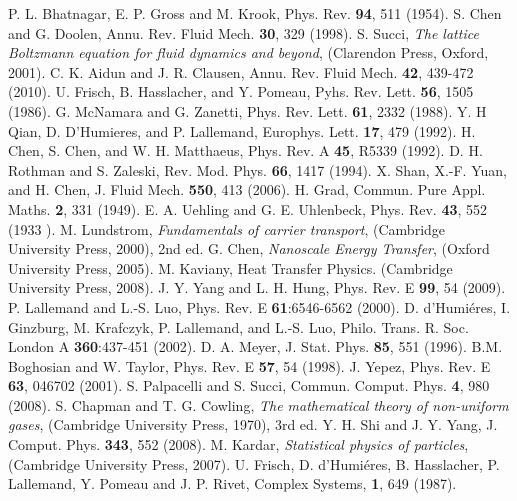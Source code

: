 \documentclass[doublecol]{epl2}
\begin{document}
\begin{thebibliography}{0}

 P. L. Bhatnagar, E. P. Gross and M. Krook, Phys. Rev. {\bf 94}, 511 (1954).
 S. Chen and G. Doolen, Annu. Rev. Fluid Mech. {\bf 30}, 329 (1998).
 S. Succi, {\sl The lattice Boltzmann equation for fluid dynamics and beyond}, (Clarendon Press, Oxford, 2001).
 C. K. Aidun and J. R. Clausen, Annu. Rev. Fluid Mech. {\bf 42}, 439-472 (2010).
 U. Frisch, B. Hasslacher, and Y. Pomeau, Pyhs. Rev. Lett. {\bf 56}, 1505 (1986).
 G. McNamara and G. Zanetti, Phys. Rev. Lett. {\bf 61}, 2332 (1988).
 Y. H Qian, D. D'Humieres, and P. Lallemand, Europhys. Lett. {\bf 17}, 479 (1992).
 H. Chen, S. Chen, and W. H. Matthaeus, Phys. Rev. A {\bf 45}, R5339 (1992).
 D. H. Rothman and S. Zaleski, Rev. Mod. Phys. {\bf 66}, 1417 (1994).
 X. Shan, X.-F. Yuan, and H. Chen, J. Fluid Mech. {\bf 550}, 413 (2006).
 H. Grad, Commun. Pure Appl. Maths. {\bf 2}, 331 (1949).
 E. A. Uehling and G. E. Uhlenbeck, Phys. Rev. {\bf 43}, 552 (1933 ).
 M. Lundstrom, {\sl Fundamentals of carrier transport}, (Cambridge University Press, 2000), 2nd ed.
 G. Chen, {\sl Nanoscale Energy Transfer}, (Oxford University Press, 2005).
 M. Kaviany, Heat Transfer Physics. (Cambridge University Press, 2008).
 J. Y. Yang and L. H. Hung, Phys. Rev. E {\bf 99}, 54 (2009).
 P. Lallemand and  L.-S. Luo, Phys. Rev. E {\bf 61}:6546-6562 (2000).
 D. d'Humi\'{e}res, I. Ginzburg, M. Krafczyk, P. Lallemand, and L.-S. Luo, Philo. Trans. R. Soc. London A {\bf 360}:437-451 (2002).
 D. A. Meyer, J. Stat. Phys. {\bf 85}, 551 (1996).
 B.M. Boghosian and W. Taylor, Phys. Rev. E {\bf 57}, 54 (1998).
 J. Yepez, Phys. Rev. E {\bf 63}, 046702 (2001).
 S. Palpacelli and S. Succi, Commun. Comput. Phys. {\bf 4}, 980 (2008).
 S. Chapman and  T. G. Cowling, {\sl The mathematical theory of non-uniform gases}, (Cambridge University Press, 1970), 3rd ed.
 Y. H. Shi and J. Y. Yang, J. Comput. Phys. {\bf 343}, 552 (2008).
 M. Kardar, {\sl Statistical physics of particles}, (Cambridge University Press, 2007).
 U. Frisch, D. d'Humi\'{e}res, B. Hasslacher, P. Lallemand, Y. Pomeau and J. P. Rivet, Complex Systems, {\bf 1}, 649 (1987).

\end{thebibliography}
\end{document}
